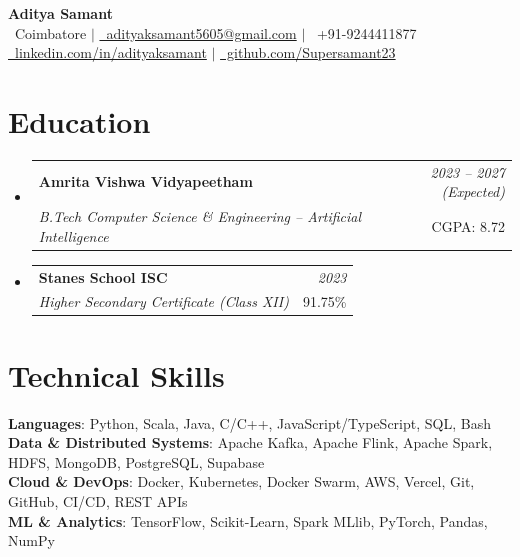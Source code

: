\documentclass[a4paper,11pt]{article}
\makeatletter
\newcommand{\resumeSubheading}[4]{
\vspace{0.5mm}\item[]
    \begin{tabular*}{0.98\textwidth}[t]{l@{\extracolsep{\fill}}r}
        \textbf{#1} & \textit{\footnotesize{#4}} \\
        \textit{\footnotesize{#3}} &  \footnotesize{#2}\\
    \end{tabular*}
    \vspace{-2.4mm}
}
\newcommand{\resumeSubHeadingListStart}{\begin{itemize}[leftmargin=*,labelsep=0mm]}
\newcommand{\resumeSubHeadingListEnd}{\end{itemize}\vspace{2mm}}
\makeatother
\begin{document}
\begin{center}
    {\Huge\bfseries\color{darkgray} Aditya Samant}\\[8pt]
    {\small
    \faMapMarker*~Coimbatore \hspace{4pt}$\vert$\hspace{4pt}
    \href{mailto:adityaksamant5605@gmail.com}{\faEnvelope~adityaksamant5605@gmail.com} \hspace{4pt}$\vert$\hspace{4pt}
    \faPhone~+91-9244411877}\\[3pt]
    {\small
    \href{https://www.linkedin.com/in/adityaksamant}{\faLinkedin~linkedin.com/in/adityaksamant} \hspace{4pt}$\vert$\hspace{4pt}
    \href{https://github.com/Supersamant23}{\faGithub~github.com/Supersamant23}
    }
\end{center}
\vspace{-4mm}

\section{\textbf{Education}}
  \resumeSubHeadingListStart
 \resumeSubheading
      {Amrita Vishwa Vidyapeetham}{CGPA: 8.72}
      {B.Tech Computer Science \& Engineering – Artificial Intelligence} {2023 – 2027 (Expected)}
 \resumeSubheading
      {Stanes School ISC}{91.75\%}
      {Higher Secondary Certificate (Class XII)} {2023}
  \resumeSubHeadingListEnd
\vspace{-3mm}

\section{\textbf{Technical Skills}}
\vspace{0.2mm}
 \begin{itemize}[leftmargin=0.05in, label={}]
    \small{\item{
     \textbf{Languages}{: Python, Scala, Java, C/C++, JavaScript/TypeScript, SQL, Bash} \\[3pt]
     \textbf{Data \& Distributed Systems}{: Apache Kafka, Apache Flink, Apache Spark, HDFS, MongoDB, PostgreSQL, Supabase} \\[3pt]
     \textbf{Cloud \& DevOps}{: Docker, Kubernetes, Docker Swarm, AWS, Vercel, Git, GitHub, CI/CD, REST APIs}\\[3pt]
     \textbf{ML \& Analytics}{: TensorFlow, Scikit-Learn, Spark MLlib, PyTorch, Pandas, NumPy}
    }}
 \end{itemize}
 \vspace{-3mm}
\end{document}
